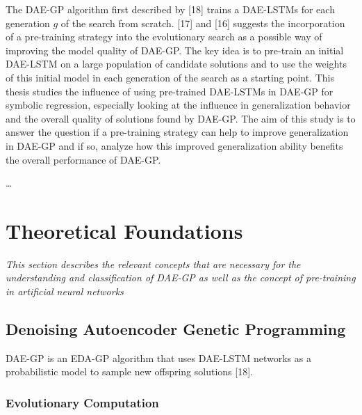 \documentclass[
  11pt,
]{article}
\begin{document}
The DAE-GP algorithm first described by {[}18{]} trains a DAE-LSTMs for
each generation \(g\) of the search from scratch. {[}17{]} and {[}16{]}
suggests the incorporation of a pre-training strategy into the
evolutionary search as a possible way of improving the model quality of
DAE-GP. The key idea is to pre-train an initial DAE-LSTM on a large
population of candidate solutions and to use the weights of this initial
model in each generation of the search as a starting point. This thesis
studies the influence of using pre-trained DAE-LSTMs in DAE-GP for
symbolic regression, especially looking at the influence in
generalization behavior and the overall quality of solutions found by
DAE-GP. The aim of this study is to answer the question if a
pre-training strategy can help to improve generalization in DAE-GP and
if so, analyze how this improved generalization ability benefits the
overall performance of DAE-GP.

\ldots{}

\hypertarget{theoretical-foundations}{%
\section{Theoretical Foundations}\label{theoretical-foundations}}

\emph{This section describes the relevant concepts that are necessary
for the understanding and classification of DAE-GP as well as the
concept of pre-training in artificial neural networks}

\hypertarget{denoising-autoencoder-genetic-programming}{%
\subsection{Denoising Autoencoder Genetic
Programming}\label{denoising-autoencoder-genetic-programming}}

DAE-GP is an EDA-GP algorithm that uses DAE-LSTM networks as a
probabilistic model to sample new offspring solutions {[}18{]}.

\hypertarget{evolutionary-computation}{%
\subsubsection{Evolutionary
Computation}\label{evolutionary-computation}}
\end{document}

